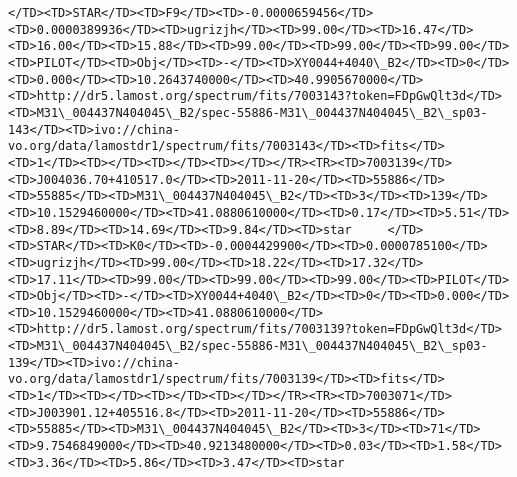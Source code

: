 \documentclass[11pt]{article}
\begin{document}
\begin{Verbatim}[commandchars=\\\{\}]
</TD><TD>STAR</TD><TD>F9</TD><TD>-0.0000659456</TD><TD>0.0000389936</TD><TD>ugrizjh</TD><TD>99.00</TD><TD>16.47</TD><TD>16.00</TD><TD>15.88</TD><TD>99.00</TD><TD>99.00</TD><TD>99.00</TD><TD>PILOT</TD><TD>Obj</TD><TD>-</TD><TD>XY0044+4040\_B2</TD><TD>0</TD><TD>0.000</TD><TD>10.2643740000</TD><TD>40.9905670000</TD><TD>http://dr5.lamost.org/spectrum/fits/7003143?token=FDpGwQlt3d</TD><TD>M31\_004437N404045\_B2/spec-55886-M31\_004437N404045\_B2\_sp03-143</TD><TD>ivo://china-vo.org/data/lamostdr1/spectrum/fits/7003143</TD><TD>fits</TD><TD>1</TD><TD></TD><TD></TD><TD></TD></TR><TR><TD>7003139</TD><TD>J004036.70+410517.0</TD><TD>2011-11-20</TD><TD>55886</TD><TD>55885</TD><TD>M31\_004437N404045\_B2</TD><TD>3</TD><TD>139</TD><TD>10.1529460000</TD><TD>41.0880610000</TD><TD>0.17</TD><TD>5.51</TD><TD>8.89</TD><TD>14.69</TD><TD>9.84</TD><TD>star     </TD><TD>STAR</TD><TD>K0</TD><TD>-0.0004429900</TD><TD>0.0000785100</TD><TD>ugrizjh</TD><TD>99.00</TD><TD>18.22</TD><TD>17.32</TD><TD>17.11</TD><TD>99.00</TD><TD>99.00</TD><TD>99.00</TD><TD>PILOT</TD><TD>Obj</TD><TD>-</TD><TD>XY0044+4040\_B2</TD><TD>0</TD><TD>0.000</TD><TD>10.1529460000</TD><TD>41.0880610000</TD><TD>http://dr5.lamost.org/spectrum/fits/7003139?token=FDpGwQlt3d</TD><TD>M31\_004437N404045\_B2/spec-55886-M31\_004437N404045\_B2\_sp03-139</TD><TD>ivo://china-vo.org/data/lamostdr1/spectrum/fits/7003139</TD><TD>fits</TD><TD>1</TD><TD></TD><TD></TD><TD></TD></TR><TR><TD>7003071</TD><TD>J003901.12+405516.8</TD><TD>2011-11-20</TD><TD>55886</TD><TD>55885</TD><TD>M31\_004437N404045\_B2</TD><TD>3</TD><TD>71</TD><TD>9.7546849000</TD><TD>40.9213480000</TD><TD>0.03</TD><TD>1.58</TD><TD>3.36</TD><TD>5.86</TD><TD>3.47</TD><TD>star     
\end{Verbatim}
\end{document}
